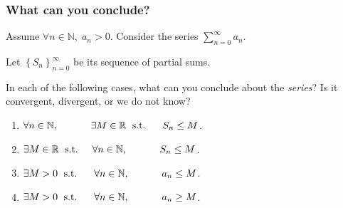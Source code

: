 \documentclass[14pt]{beamer}
\begin{document}
	\begin{frame}[t]
		\fontsize{13}{13}\selectfont
		\frametitle{What can you conclude?}

		Assume $\displaystyle \forall n \in \mathbb{N}, \; a_{n}>0$. Consider the
		series $\displaystyle \sum_{n=0}^{\infty}a_{n}$.

		Let $\displaystyle \left\{ S_{n}\right\}_{n=0}^{\infty}$ be its sequence of
		partial sums.
		\vspace{.5cm}

		In each of the following cases, what can you conclude about the \emph{series}?
		Is it convergent, divergent, or we do not know?
		\vspace{.5cm}

		\begin{enumerate}
			\item $\displaystyle \forall n \in \mathbb{N}, \; \text{ \phantom{s.t.} }\quad
				\exists M \in \mathbb{R}\; \text{ s.t. }\; \quad S_{n}\leq M$.

			\item $\displaystyle \exists M \in \mathbb{R}\; \text{ s.t. }\quad \forall
				n \in \mathbb{N}, \; \text{ \phantom{s.t.} }\quad S_{n}\leq M$.

			\item $\displaystyle \exists M >0 \; \text{ s.t. }\; \quad \forall n \in \mathbb{N}
				, \; \text{ \phantom{s.t.} }\quad a_{n}\leq M$.

			\item $\displaystyle \exists M >0 \; \text{ s.t. }\; \quad \forall n \in \mathbb{N}
				, \; \text{ \phantom{s.t.} }\quad a_{n}\geq M$.
		\end{enumerate}
	\end{frame}
\end{document}
